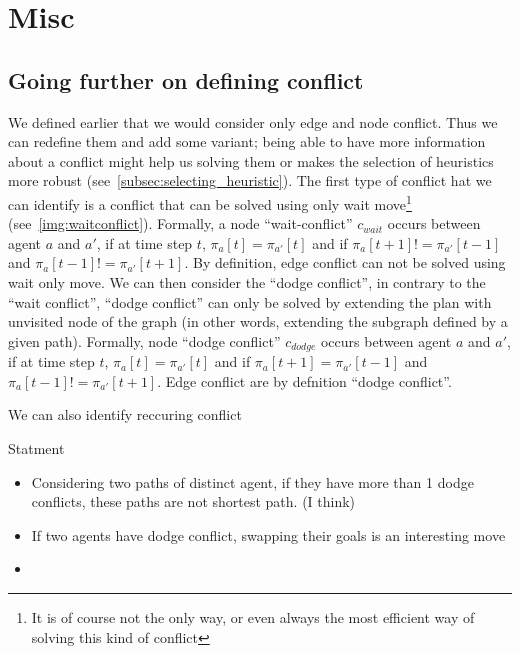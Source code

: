 
\section{Misc}

\subsection{Going further on defining conflict}
We defined earlier that we would consider only edge and node conflict. Thus we can redefine them and add some variant; being able to have more information about a conflict might help us solving them or makes the selection of heuristics more robust (see~\ref{subsec:selecting_heuristic}). The first type of conflict hat we can identify is a conflict that can be solved using only wait move\footnote{It is of course not the only way, or even always the most efficient way of solving this kind of conflict} (see~\ref{img:waitconflict}). Formally, a  node ``wait-conflict'' \(c_{wait}\) occurs between agent \(a\) and \(a'\), if at time step \(t\),  \(\pi_a[t] = \pi_{a'}[t]\) and if \(\pi_a[t+1] != \pi_{a'}[t-1]\) and \(\pi_a[t-1] != \pi_{a'}[t+1]\). By definition, edge conflict can not be solved using wait only move. We can then consider the ``dodge conflict'', in contrary to the ``wait conflict'', ``dodge conflict'' can only be solved by extending the plan with unvisited node of the graph (in other words, extending the subgraph defined by a given path). Formally, node ``dodge conflict'' \(c_{dodge}\) occurs between agent \(a\) and \(a'\), if at time step \(t\),  \(\pi_a[t] = \pi_{a'}[t]\) and if \(\pi_a[t+1] = \pi_{a'}[t-1]\) and \(\pi_a[t-1] != \pi_{a'}[t+1]\). Edge conflict are by defnition ``dodge conflict''.

We can also identify reccuring conflict

Statment
\begin{itemize}
  \item Considering two paths of distinct agent, if they have more than 1 dodge conflicts, these paths are not shortest path. (I think)
  \item If two agents have dodge conflict, swapping their goals is an interesting move
  \item 
\end{itemize}






